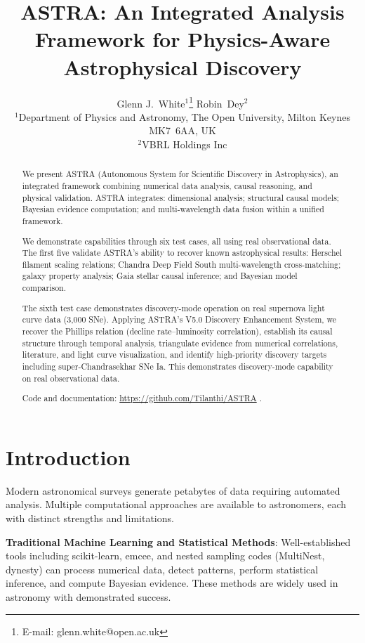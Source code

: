 \documentclass[usenatbib]{rasti}
\title[ASTRA: Integrated Analysis Framework for Astrophysics]{ASTRA: An Integrated Analysis Framework for Physics-Aware Astrophysical Discovery}
\author[White \& Dey]{
Glenn J.~White$^{1}$\thanks{E-mail: glenn.white@open.ac.uk}
Robin~Dey$^{2}$\\
$^{1}$Department of Physics and Astronomy, The Open University, Milton Keynes MK7~6AA, UK\\
$^{2}$VBRL Holdings Inc
}
\begin{document}

\maketitle

\label{firstpage}

\begin{abstract}
We present ASTRA (Autonomous System for Scientific Discovery in Astrophysics), an integrated framework combining numerical data analysis, causal reasoning, and physical validation. ASTRA integrates: dimensional analysis; structural causal models; Bayesian evidence computation; and multi-wavelength data fusion within a unified framework.

We demonstrate capabilities through six test cases, all using real observational data. The first five validate ASTRA's ability to recover known astrophysical results: Herschel filament scaling relations; Chandra Deep Field South multi-wavelength cross-matching; galaxy property analysis; Gaia stellar causal inference; and Bayesian model comparison.

The sixth test case demonstrates discovery-mode operation on real supernova light curve data (3,000 SNe). Applying ASTRA's V5.0 Discovery Enhancement System, we recover the Phillips relation (decline rate--luminosity correlation), establish its causal structure through temporal analysis, triangulate evidence from numerical correlations, literature, and light curve visualization, and identify high-priority discovery targets including super-Chandrasekhar SNe Ia. This demonstrates discovery-mode capability on real observational data.

Code and documentation: \url{https://github.com/Tilanthi/ASTRA} \cite{astra_github}.
\end{abstract}

\section{Introduction}

Modern astronomical surveys generate petabytes of data requiring automated analysis. Multiple computational approaches are available to astronomers, each with distinct strengths and limitations.

\textbf{Traditional Machine Learning and Statistical Methods}: Well-established tools including scikit-learn, emcee, and nested sampling codes (MultiNest, dynesty) can process numerical data, detect patterns, perform statistical inference, and compute Bayesian evidence. These methods are widely used in astronomy with demonstrated success.
\end{document}
